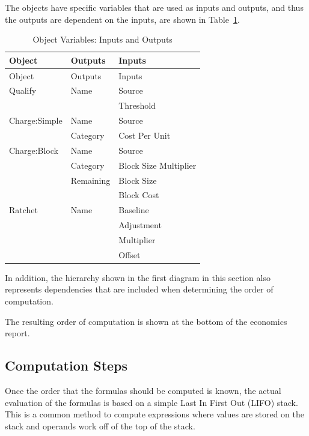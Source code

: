 The objects have specific variables that are used as inputs and outputs, and thus the outputs are dependent on the inputs, are shown in Table~\ref{table:object-variables-input-output}.

\textbf{\emph{}}

\begin{longtable}[c]{@{}lll@{}}
\caption{Object Variables: Inputs and Outputs \label{table:object-variables-input-output}} \tabularnewline
\toprule
Object & Outputs & Inputs \tabularnewline
\midrule
\endfirsthead

\toprule
Object & Outputs & Inputs \tabularnewline
\midrule
\endhead

Qualify & Name & Source \tabularnewline
~ & ~ & Threshold \tabularnewline
Charge:Simple & Name & Source \tabularnewline
~ & Category & Cost Per Unit \tabularnewline
Charge:Block & Name & Source \tabularnewline
~ & Category & Block Size Multiplier \tabularnewline
~ & Remaining & Block Size \tabularnewline
~ & ~ & Block Cost \tabularnewline
Ratchet & Name & Baseline \tabularnewline
~ & ~ & Adjustment \tabularnewline
~ & ~ & Multiplier \tabularnewline
~ & ~ & Offset \tabularnewline
\bottomrule
\end{longtable}

In addition, the hierarchy shown in the first diagram in this section also represents dependencies that are included when determining the order of computation.

The resulting order of computation is shown at the bottom of the economics report.

\subsection{Computation Steps}\label{computation-steps}

Once the order that the formulas should be computed is known, the actual evaluation of the formulas is based on a simple Last In First Out (LIFO) stack.~ This is a common method to compute expressions where values are stored on the stack and operands work off of the top of the stack.
